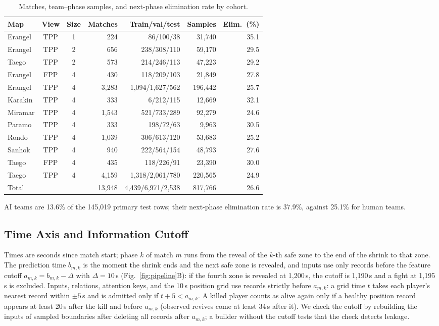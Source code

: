 \documentclass[sigconf,anonymous]{acmart}
\begin{document}
\begin{table}[t]
\centering
\caption{Matches, team--phase samples, and next-phase elimination rate by cohort.}
\label{tab:cohorts}
\footnotesize
\setlength{\tabcolsep}{2.7pt}
\begin{tabular}{lccrrrr}
\hline
Map & View & Size & Matches & Train/val/test & Samples & Elim.\ (\%) \\
\hline
Erangel & TPP & 1 & 224 & 86/100/38 & 31,740 & 35.1 \\
Erangel & TPP & 2 & 656 & 238/308/110 & 59,170 & 29.5 \\
Taego & TPP & 2 & 573 & 214/246/113 & 47,223 & 29.2 \\
Erangel & FPP & 4 & 430 & 118/209/103 & 21,849 & 27.8 \\
Erangel & TPP & 4 & 3,283 & 1,094/1,627/562 & 196,442 & 25.7 \\
Karakin & TPP & 4 & 333 & 6/212/115 & 12,669 & 32.1 \\
Miramar & TPP & 4 & 1,543 & 521/733/289 & 92,279 & 24.6 \\
Paramo & TPP & 4 & 333 & 198/72/63 & 9,963 & 30.5 \\
Rondo & TPP & 4 & 1,039 & 306/613/120 & 53,683 & 25.2 \\
Sanhok & TPP & 4 & 940 & 222/564/154 & 48,793 & 27.6 \\
Taego & FPP & 4 & 435 & 118/226/91 & 23,390 & 30.0 \\
Taego & TPP & 4 & 4,159 & 1,318/2,061/780 & 220,565 & 24.9 \\
\hline
Total & & & 13,948 & 4,439/6,971/2,538 & 817,766 & 26.6 \\
\hline
\end{tabular}
\smallskip
\parbox{\columnwidth}{\scriptsize AI teams are 13.6\% of the 145,019 primary test rows; their next-phase elimination rate is 37.9\%, against 25.1\% for human teams.}
\end{table}

\subsection{Time Axis and Information Cutoff}
\label{sec:method:samples}
Times are seconds since match start; phase $k$ of match $m$ runs from the reveal of the $k$-th safe zone to the end of the shrink to that zone. The prediction time $b_{m,k}$ is the moment the shrink ends and the next safe zone is revealed, and inputs use only records before the feature cutoff $a_{m,k}=b_{m,k}-\Delta$ with $\Delta=10$\,s (Fig.~\ref{fig:pipeline}B): if the fourth zone is revealed at 1,200\,s, the cutoff is 1,190\,s and a fight at 1,195\,s is excluded. Inputs, relations, attention keys, and the 10\,s position grid use records strictly before $a_{m,k}$: a grid time $t$ takes each player's nearest record within $\pm5$\,s and is admitted only if $t+5<a_{m,k}$. A killed player counts as alive again only if a healthy position record appears at least 20\,s after the kill and before $a_{m,k}$ (observed revives come at least 34\,s after it). We check the cutoff by rebuilding the inputs of sampled boundaries after deleting all records after $a_{m,k}$; a builder without the cutoff tests that the check detects leakage.
\end{document}

